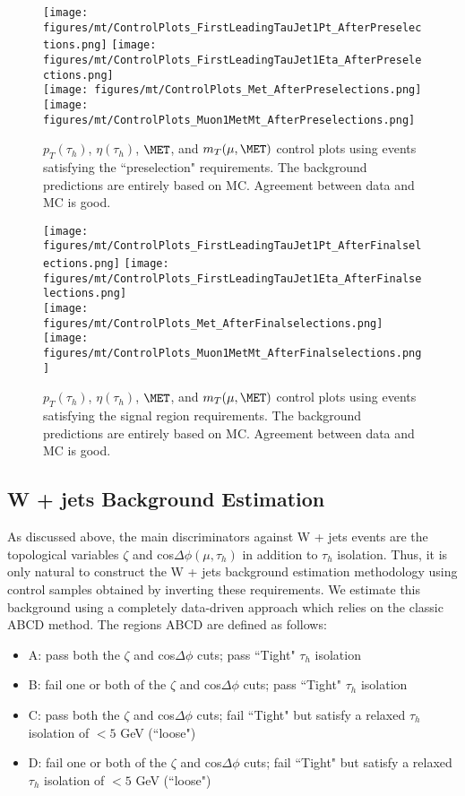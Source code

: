 \begin{figure}\centering
  \texttt{[image: figures/mt/ControlPlots\_FirstLeadingTauJet1Pt\_AfterPreselections.png]}
  \texttt{[image: figures/mt/ControlPlots\_FirstLeadingTauJet1Eta\_AfterPreselections.png]} \\
  \texttt{[image: figures/mt/ControlPlots\_Met\_AfterPreselections.png]}
  \texttt{[image: figures/mt/ControlPlots\_Muon1MetMt\_AfterPreselections.png]}
  \caption{\label{fig:muTauPreselectionControlPlots} $p_{T}(\tau_{h})$, $\eta(\tau_{h})$, $\MET$, and $m_{T}(\mu,\MET)$ control plots using events satisfying the 
``preselection" requirements. The background predictions are entirely based on MC. Agreement between data and MC is good.}
\end{figure}

\begin{figure}\centering
  \texttt{[image: figures/mt/ControlPlots\_FirstLeadingTauJet1Pt\_AfterFinalselections.png]}
  \texttt{[image: figures/mt/ControlPlots\_FirstLeadingTauJet1Eta\_AfterFinalselections.png]} \\
  \texttt{[image: figures/mt/ControlPlots\_Met\_AfterFinalselections.png]}
  \texttt{[image: figures/mt/ControlPlots\_Muon1MetMt\_AfterFinalselections.png]}
  \caption{\label{fig:muTauFinalselectionControlPlots} $p_{T}(\tau_{h})$, $\eta(\tau_{h})$, $\MET$, and $m_{T}(\mu,\MET)$ control plots using events satisfying 
the signal region requirements. The background predictions are entirely based on MC. Agreement between data and MC is good.}
\end{figure}

\subsection{W + jets Background Estimation}

As discussed above, the main discriminators against W + jets events are the topological variables $\zeta$ and cos$\Delta\phi(\mu,\tau_{h})$ in addition to 
$\tau_{h}$ isolation. Thus, it is only natural to construct the W + jets background estimation methodology using control samples obtained by inverting these 
requirements. We estimate this background using a completely data-driven approach which relies on the classic ABCD method. The regions ABCD are defined as 
follows:

\begin{itemize}
  \item A: pass both the $\zeta$ and cos$\Delta\phi$ cuts; pass ``Tight" $\tau_{h}$ isolation
  \item B: fail one or both of the $\zeta$ and cos$\Delta\phi$ cuts; pass ``Tight" $\tau_{h}$ isolation
  \item C: pass both the $\zeta$ and cos$\Delta\phi$ cuts; fail ``Tight" but satisfy a relaxed $\tau_{h}$ isolation of $< 5$ GeV (``loose")
  \item D: fail one or both of the $\zeta$ and cos$\Delta\phi$ cuts; fail ``Tight" but satisfy a relaxed $\tau_{h}$ isolation of $< 5$ GeV (``loose")
\end{itemize}

